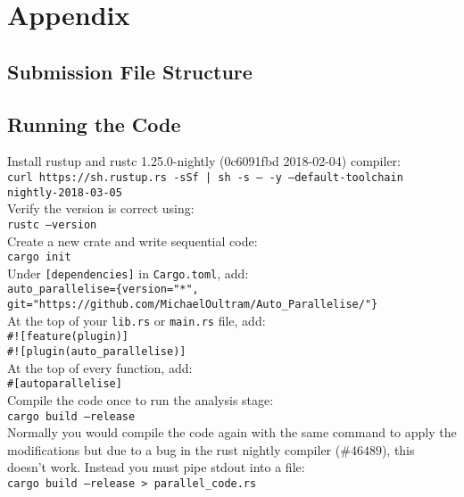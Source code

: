 \chapter{Appendix}
\section{Submission File Structure}

\section{Running the Code}
Install rustup and rustc 1.25.0-nightly (0c6091fbd 2018-02-04) compiler: \\
\texttt{curl https://sh.rustup.rs -sSf | sh -s -- -y --default-toolchain nightly-2018-03-05} \\

Verify the version is correct using: \\
\texttt{rustc --version} \\

Create a new crate and write sequential code: \\
\texttt{cargo init} \\

Under \texttt{[dependencies]} in \texttt{Cargo.toml}, add: \\
\texttt{auto\_parallelise=\{version="*", git="https://github.com/MichaelOultram/Auto\_Parallelise/"\}} \\

At the top of your \texttt{lib.rs} or \texttt{main.rs} file, add: \\
\texttt{\#![feature(plugin)]} \\
\texttt{\#![plugin(auto\_parallelise)]} \\

At the top of every function, add: \\
\texttt{\#[autoparallelise]} \\

Compile the code once to run the analysis stage: \\
\texttt{cargo build --release} \\

Normally you would compile the code again with the same command to apply the modifications but due to a bug in the rust nightly compiler ($\#46489$), this doesn't work. Instead you must pipe stdout into a file: \\
\texttt{cargo build --release > parallel\_code.rs} \\

